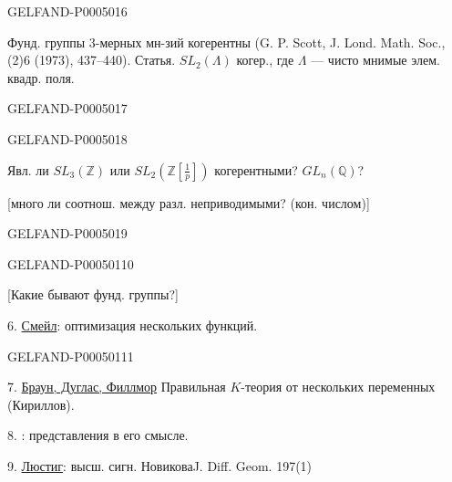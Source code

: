 \begin{GelfandAdjacentEvidence}{GELFAND-P000501}{6}

Фунд. группы 3-мерных мн-зий когерентны
(G. P. Scott, J. Lond. Math. Soc., (2)6 (1973), 437--440). Статья.
$SL_2(\Lambda)$ когер., где $\Lambda$ — чисто мнимые элем. квадр. поля.
\end{GelfandAdjacentEvidence}
\begin{GelfandAdjacentEvidence}{GELFAND-P000501}{7}

\end{GelfandAdjacentEvidence}
\begin{GelfandAdjacentEvidence}{GELFAND-P000501}{8}


Явл. ли $SL_3(\mathbb Z)$ или $SL_2(\mathbb Z[\frac1p])$ когерентными?
$GL_n(\mathbb Q)$?

[много ли соотнош. между разл. неприводимыми? (кон. числом)]
\end{GelfandAdjacentEvidence}
\begin{GelfandAdjacentEvidence}{GELFAND-P000501}{9}

\end{GelfandAdjacentEvidence}
\begin{GelfandAdjacentEvidence}{GELFAND-P000501}{10}


[Какие бывают фунд. группы?]

6. \uline{Смейл}: оптимизация нескольких функций.
\end{GelfandAdjacentEvidence}
\begin{GelfandAdjacentEvidence}{GELFAND-P000501}{11}


7. \uline{Браун, Дуглас, Филлмор} \quad Правильная $K$-теория от нескольких переменных (Кириллов).

8. : представления в его смысле.

9. \uline{Люстиг}: высш. сигн. Новикова\qquad J. Diff. Geom. 197(1)
\end{GelfandAdjacentEvidence}
